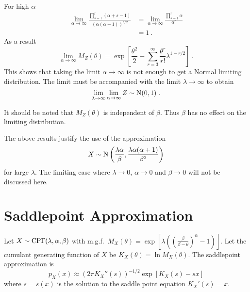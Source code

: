 For high $\alpha$
\begin{align}
  \lim_{\alpha\rightarrow\infty}
  \frac{
    \prod_{s=1}^r(\alpha+s-1)
  }
  {
    (\alpha(\alpha+1))^{r/2}
  }
  &=
  \lim_{\alpha\rightarrow\infty}
  \frac{
    \prod_{s=1}^r\alpha
  }
  {
    \alpha^{r}
  }
  \nonumber\\
  &= 1
  \ .
\end{align}
As a result
\begin{equation}
  \lim_{\alpha\rightarrow\infty}
  M_Z(\theta)=
  \exp\left[
    \frac{\theta^2}{2}
    +\sum_{r=3}^\infty
    \frac{\theta^r}{r!}
    \lambda^{1-r/2}
  \right]
  \ .
\end{equation}
This shows that taking the limit $\alpha\rightarrow\infty$ is not enough to get a Normal limiting distribution. The limit must be accompanied with the limit $\lambda\rightarrow\infty$ to obtain
\begin{equation}
  \lim_{\lambda\rightarrow\infty}\lim_{\alpha\rightarrow\infty}Z\sim\operatorname{N}(0,1)
  \ .
\end{equation}

It should be noted that $M_Z(\theta)$ is independent of $\beta$. Thus $\beta$ has no effect on the limiting distribution.

The above results justify the use of the approximation
\begin{equation}
  X\sim\operatorname{N}\left(\frac{\lambda\alpha}{\beta},\frac{\lambda\alpha(\alpha+1)}{\beta^2}\right)
\end{equation}
for large $\lambda$. The limiting case where $\lambda\rightarrow 0$, $\alpha\rightarrow 0$ and $\beta\rightarrow 0$ will not be discussed here.

\section{Saddlepoint Approximation}
\label{chapter:appendix_saddlepoint}
Let $X\sim\operatorname{CP\Gamma}(\lambda,\alpha,\beta)$ with m.g.f.~$M_X(\theta)=\exp\left[\lambda\left(\left(\frac{\beta}{\beta-\theta}\right)^{\alpha}-1\right)\right]$. Let the cumulant generating function of $X$ be $K_X(\theta)=\ln M_X(\theta)$. The saddlepoint approximation is 
\begin{equation}
  p_X(x)\approx\left(2\pi K_X''(s)\right)^{-1/2}\exp\left[K_X(s)-sx\right]
  \label{eq:appendix_saddlepoint}
\end{equation}
where $s=s(x)$ is the solution to the saddle point equation $K_X'(s)=x$.

